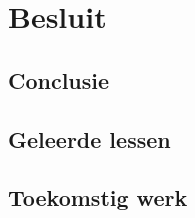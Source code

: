 \chapter{Besluit}
\label{chap:besluit}

\section{Conclusie} %

\section{Geleerde lessen} %


\section{Toekomstig werk} %

